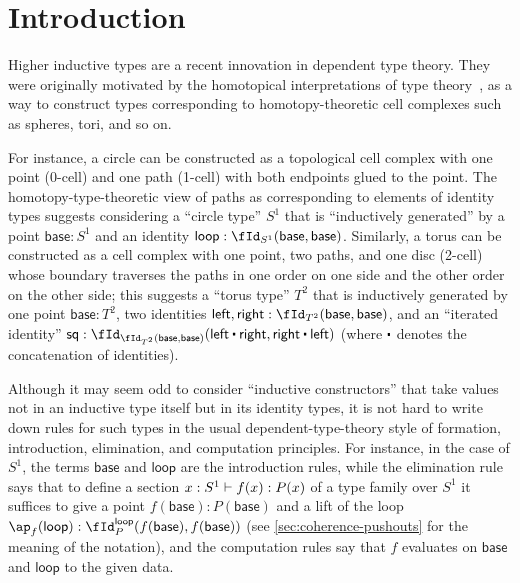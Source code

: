 \tableofcontents

\section{Introduction}
\label{sec:introduction}

Higher inductive types are a recent innovation in dependent type theory.
They were originally motivated by the homotopical interpretations of type theory~\cite{aw:htpy-idtype,klv:ssetmodel,hottbook}, as a way to construct types corresponding to homotopy-theoretic cell complexes such as spheres, tori, and so on.

For instance, a circle can be constructed as a topological cell complex with one point (0-cell) and one path (1-cell) with both endpoints glued to the point.
The homotopy-type-theoretic view of paths as corresponding to elements of identity types suggests considering a ``circle type'' $S^1$ that is ``inductively generated'' by a point $\mathsf{base}:S^1$ and an identity $\mathsf{loop}: \id[S^1]{\mathsf{base}}{\mathsf{base}}$.
Similarly, a torus can be constructed as a cell complex with one point, two paths, and one disc (2-cell) whose boundary traverses the paths in one order on one side and the other order on the other side; this suggests a ``torus type'' $T^2$ that is inductively generated by one point $\mathsf{base}:T^2$, two identities $\mathsf{left},\mathsf{right}:\id[T^2]{\mathsf{base}}{\mathsf{base}}$, and an ``iterated identity'' $\mathsf{sq} : \id[{\id[T^2]{\mathsf{base}}{\mathsf{base}}}]{\mathsf{left}\ct\mathsf{right}}{\mathsf{right}\ct\mathsf{left}}$ (where $\ct$ denotes the concatenation of identities).

Although it may seem odd to consider ``inductive constructors'' that take values not in an inductive type itself but in its identity types, it is not hard to write down rules for such types in the usual dependent-type-theory style of formation, introduction, elimination, and computation principles.
For instance, in the case of $S^1$, the terms $\mathsf{base}$ and $\mathsf{loop}$ are the introduction rules, while the elimination rule says that to define a section $x:S^1 \vdash f(x) : P(x)$ of a type family over $S^1$ it suffices to give a point $f(\mathsf{base}):P(\mathsf{base})$ and a lift of the loop $\ap_{f}(\mathsf{loop}) : \idover[P]{f(\mathsf{base})}{f(\mathsf{base})}{\mathsf{loop}}$ (see \cref{sec:coherence-pushouts} for the meaning of the notation), and the computation rules say that $f$ evaluates on $\mathsf{base}$ and $\mathsf{loop}$ to the given data.

